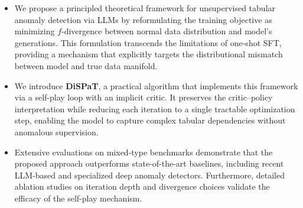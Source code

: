 \begin{itemize}
    \item We propose a principled theoretical framework for unsupervised tabular anomaly detection via LLMs by reformulating the training objective as minimizing $f$-divergence between normal data distribution and model's generations. This formulation transcends the limitations of one-shot SFT, providing a mechanism that explicitly targets the distributional mismatch between model and true data manifold.

    \item We introduce \textbf{DiSPaT}, a practical algorithm that implements this framework via a self-play loop with an implicit critic. It preserves the critic--policy interpretation while reducing each iteration to a single tractable optimization step, enabling the model to capture complex tabular dependencies without anomalous supervision.

    \item Extensive evaluations on mixed-type benchmarks demonstrate that the proposed approach outperforms state-of-the-art baselines, including recent LLM-based and specialized deep anomaly detectors. Furthermore, detailed ablation studies on iteration depth and divergence choices validate the efficacy of the self-play mechanism.

\end{itemize}
